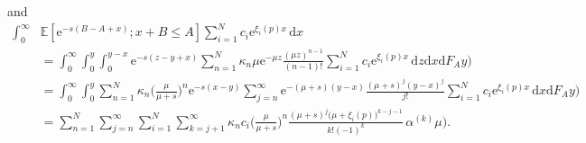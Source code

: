 \documentclass[reqno, 11pt, a4paper]{article}
\theoremstyle{plain}
\theoremstyle{remark}
\numberwithin{equation}{section}
\begin{document}
and
\begin{align}\label{eq:int mt}
\nonumber \int_{0}^\infty&{\mathbb{E}}[\mathrm{e}^{-s(B-A+x)};x+B\leqslant A]\sum_{i=1}^N c_i \mathrm{e}^{\xi_i(p)x} \,\mathrm{d}x\\
\nonumber &=\int_0^\infty\int_0^y\int_0^{y-x} \mathrm{e}^{-s(z-y+x)} \sum_{n=1}^N \kappa_n \mu \mathrm{e}^{-\mu z} \frac{(\mu z)^{n-1}}{(n-1)!} \sum_{i=1}^N c_i \mathrm{e}^{\xi_i(p)x}\,\mathrm{d}z \mathrm{d}x \mathrm{d}{\mbox{$F_A^{}$}}y)\\
\nonumber &=\int_0^\infty\int_0^y \sum_{n=1}^N \kappa_n \biggl(\frac{\mu}{\mu+s}\biggr)^n \mathrm{e}^{-s(x-y)} \sum_{j=n}^\infty \mathrm{e}^{-(\mu+s)(y-x)} \frac{(\mu+s)^j (y-x)^j}{j!} \sum_{i=1}^N  c_i \mathrm{e}^{\xi_i(p)x}\,\mathrm{d}x \mathrm{d}{\mbox{$F_A^{}$}}y)\\
&= \sum_{n=1}^N \sum_{j=n}^\infty\sum_{i=1}^N\sum_{k=j+1}^\infty \kappa_n c_i  \biggl(\frac{\mu}{\mu+s}\biggr)^n \frac{ (\mu+s)^j \bigl(\mu+\xi_i(p)\bigr)^{k-j-1}}{k!(-1)^k}\,{\mbox{$\alpha^{(k)}$}}\mu).
\end{align}
\end{document}

